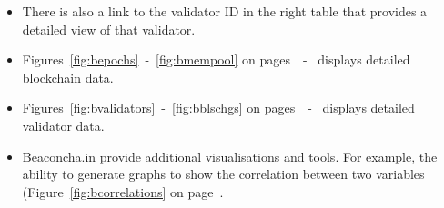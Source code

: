 \documentclass[UTF8]{article}
\begin{document}
\begin{itemize}
\begin{itemize}
		\item There is also a link to the validator ID in the right table that provides a detailed view of that validator.
		\item Figures~\ref{fig:bepochs}~-~\ref{fig:bmempool} on pages~\pageref{fig:bepochs}~-~\pageref{fig:bmempool} displays detailed blockchain data.
		\item Figures~\ref{fig:bvalidators}~-~\ref{fig:bblschgs} on pages~\pageref{fig:bvalidators}~-~\pageref{fig:bblschgs} displays detailed validator data.
		\item Beaconcha.in provide additional visualisations and tools. For example, the ability to generate graphs to show the correlation between two variables (Figure~\ref{fig:bcorrelations} on page~\pageref{fig:bcorrelations}.
	\end{itemize}


\end{itemize}
\end{document}
